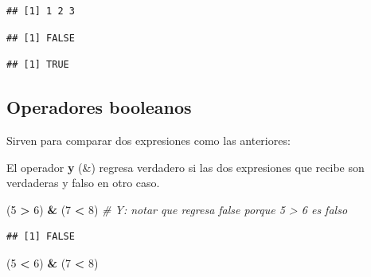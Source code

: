 \documentclass[]{book}
\newenvironment{Shaded}{\begin{snugshade}}{\end{snugshade}}
\newcommand{\KeywordTok}[1]{\textcolor[rgb]{0.13,0.29,0.53}{\textbf{#1}}}
\newcommand{\DecValTok}[1]{\textcolor[rgb]{0.00,0.00,0.81}{#1}}
\newcommand{\StringTok}[1]{\textcolor[rgb]{0.31,0.60,0.02}{#1}}
\newcommand{\CommentTok}[1]{\textcolor[rgb]{0.56,0.35,0.01}{\textit{#1}}}
\newcommand{\OperatorTok}[1]{\textcolor[rgb]{0.81,0.36,0.00}{\textbf{#1}}}
\newcommand{\NormalTok}[1]{#1}
\theoremstyle{definition}
\theoremstyle{definition}
\theoremstyle{definition}
\theoremstyle{remark}
\begin{document}
\begin{verbatim}
## [1] 1 2 3
\end{verbatim}

\begin{Shaded}
\end{Shaded}

\begin{verbatim}
## [1] FALSE
\end{verbatim}

\begin{Shaded}
\end{Shaded}

\begin{verbatim}
## [1] TRUE
\end{verbatim}

\subsection{Operadores booleanos}\label{operadores-booleanos}

Sirven para comparar dos expresiones como las anteriores:

El operador \textbf{y} (\&) regresa verdadero si las dos expresiones que
recibe son verdaderas y falso en otro caso.

\begin{Shaded}
\begin{Highlighting}[]
\NormalTok{(}\DecValTok{5} \OperatorTok{>}\StringTok{ }\DecValTok{6}\NormalTok{) }\OperatorTok{&}\StringTok{ }\NormalTok{(}\DecValTok{7} \OperatorTok{<}\StringTok{ }\DecValTok{8}\NormalTok{) }\CommentTok{# Y: notar que regresa false porque 5 > 6 es falso}
\end{Highlighting}
\end{Shaded}

\begin{verbatim}
## [1] FALSE
\end{verbatim}

\begin{Shaded}
\begin{Highlighting}[]
\NormalTok{(}\DecValTok{5} \OperatorTok{<}\StringTok{ }\DecValTok{6}\NormalTok{) }\OperatorTok{&}\StringTok{ }\NormalTok{(}\DecValTok{7} \OperatorTok{<}\StringTok{ }\DecValTok{8}\NormalTok{)}
\end{Highlighting}
\end{Shaded}
\end{document}
